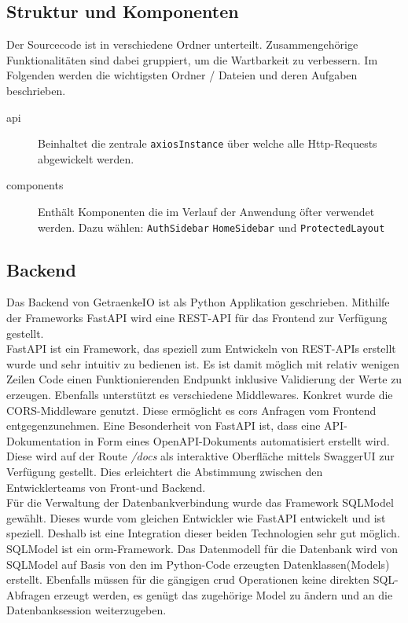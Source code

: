 \documentclass[conference,a4paper]{cs-techrep}
\begin{document}
\subsection{Struktur und Komponenten}
Der Sourcecode ist in verschiedene Ordner unterteilt. Zusammengehörige Funktionalitäten sind dabei gruppiert, um die Wartbarkeit zu verbessern. Im Folgenden werden die wichtigsten Ordner / Dateien und deren Aufgaben beschrieben.

\begin{description}
	\item[api] Beinhaltet die zentrale \texttt{axiosInstance} über welche alle Http-Requests abgewickelt werden.
	\item[components] Enthält Komponenten die im Verlauf der Anwendung öfter verwendet werden. Dazu wählen: \texttt{AuthSidebar} \texttt{HomeSidebar} und \texttt{ProtectedLayout}
\end{description}

\subsection{Backend} %
Das Backend von GetraenkeIO ist als Python Applikation geschrieben.
Mithilfe der Frameworks FastAPI wird eine REST-API für das Frontend zur Verfügung gestellt. \\  
FastAPI ist ein Framework, das speziell zum Entwickeln von REST-APIs erstellt wurde und sehr intuitiv zu bedienen ist.
Es ist damit möglich mit relativ wenigen Zeilen Code einen Funktionierenden Endpunkt inklusive Validierung der Werte zu erzeugen. Ebenfalls unterstützt es verschiedene Middlewares. Konkret wurde die CORS-Middleware genutzt. Diese ermöglicht es \ac{cors} Anfragen vom Frontend entgegenzunehmen.
Eine Besonderheit von FastAPI ist, dass eine API-Dokumentation in Form eines OpenAPI-Dokuments \cite{openapi} automatisiert erstellt wird. Diese wird auf der Route \emph{/docs} als interaktive Oberfläche mittels SwaggerUI  \cite{swagger} zur Verfügung gestellt. Dies erleichtert die Abstimmung zwischen den Entwicklerteams von Front-und Backend. \\  
Für die Verwaltung der Datenbankverbindung wurde das Framework SQLModel gewählt. Dieses wurde vom gleichen Entwickler wie FastAPI entwickelt und ist speziell. Deshalb ist eine Integration dieser beiden Technologien sehr gut möglich. SQLModel ist ein \ac{orm}-Framework.
Das Datenmodell für die Datenbank wird von SQLModel auf Basis von den im Python-Code erzeugten Datenklassen(Models) erstellt. Ebenfalls müssen für die gängigen \ac{crud} Operationen keine direkten SQL-Abfragen erzeugt werden, es genügt das zugehörige Model  zu ändern und an die Datenbanksession weiterzugeben.
\end{document}
